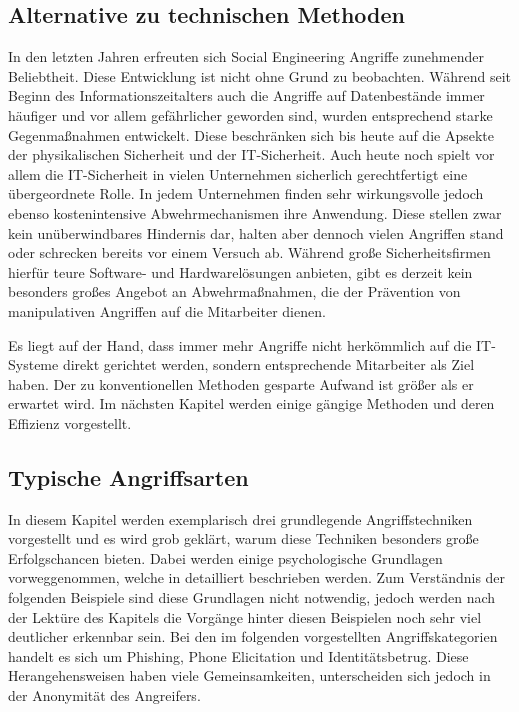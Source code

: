 \subsection{Alternative zu technischen Methoden}\label{sec:alternative_zu_technischen_methoden}
In den letzten Jahren erfreuten sich Social Engineering Angriffe zunehmender Beliebtheit.
Diese Entwicklung ist nicht ohne Grund zu beobachten.
Während seit Beginn des Informationszeitalters auch die Angriffe auf Datenbestände immer häufiger und
vor allem gefährlicher geworden sind, wurden entsprechend starke Gegenmaßnahmen entwickelt.
Diese beschränken sich bis heute auf die Apsekte der physikalischen Sicherheit und der IT-Sicherheit.
Auch heute noch spielt vor allem die IT-Sicherheit in vielen Unternehmen sicherlich gerechtfertigt
eine übergeordnete Rolle.
In jedem Unternehmen finden sehr wirkungsvolle jedoch ebenso kostenintensive Abwehrmechanismen ihre Anwendung.
Diese stellen zwar kein unüberwindbares Hindernis dar, halten aber dennoch vielen Angriffen stand oder
schrecken bereits vor einem Versuch ab.
Während große Sicherheitsfirmen hierfür teure Software- und Hardwarelösungen anbieten, gibt es derzeit
kein besonders großes Angebot an Abwehrmaßnahmen, die der Prävention von manipulativen Angriffen auf
die Mitarbeiter dienen. \cite{hacking-the-human}

Es liegt auf der Hand, dass immer mehr Angriffe nicht herkömmlich auf die IT-Systeme direkt
gerichtet werden, sondern entsprechende Mitarbeiter als Ziel haben.
Der zu konventionellen Methoden gesparte Aufwand ist größer als er erwartet wird.
Im nächsten Kapitel werden einige gängige Methoden und deren Effizienz vorgestellt.

\subsection{Typische Angriffsarten}\label{sec:gangige_angriffe}
In diesem Kapitel werden exemplarisch drei grundlegende Angriffstechniken vorgestellt und es wird grob geklärt, warum diese Techniken besonders große Erfolgschancen bieten.
Dabei werden einige psychologische Grundlagen vorweggenommen, welche in  detailliert
beschrieben werden.
Zum Verständnis der folgenden Beispiele sind diese Grundlagen nicht notwendig, jedoch werden nach der
Lektüre des Kapitels  die Vorgänge hinter diesen Beispielen noch sehr viel deutlicher erkennbar sein.
Bei den im folgenden vorgestellten Angriffskategorien handelt es sich um Phishing, Phone Elicitation und Identitätsbetrug. Diese Herangehensweisen haben viele Gemeinsamkeiten, unterscheiden sich jedoch in der Anonymität des Angreifers.

